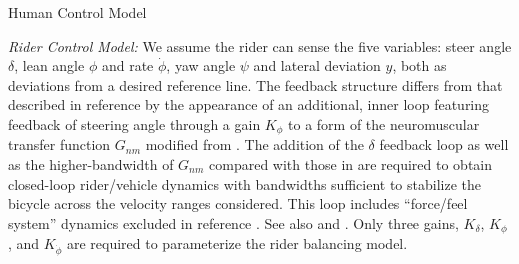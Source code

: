 \documentclass[final]{beamer}
\newlength{\onecolwid}
\begin{document}
{\begin{center}
\begin{columns}[t]
\begin{column}{\onecolwid}
\begin{block}{Human Control Model}
{    \emph{Rider Control Model:} We assume the rider can sense the five
    variables: steer angle $\delta$, lean angle $\phi$ and rate $\dot{\phi}$,
    yaw angle $\psi$ and lateral deviation $y$, both as deviations from a
    desired reference line. The feedback structure differs from that described
    in reference \cite{Hess2006} by the appearance of an additional, inner loop
    featuring feedback of steering angle through a gain $K_\phi$ to a form of
    the neuromuscular transfer function $G_{nm}$ modified from \cite{Hess2006}.
    The addition of the $\delta$ feedback loop as well as the higher-bandwidth
    of $G_{nm}$ compared with those in \cite{Hess2006} are required to obtain
    closed-loop rider/vehicle dynamics with bandwidths sufficient to stabilize
    the bicycle across the velocity ranges considered. This loop includes
    ``force/feel system'' dynamics excluded in reference \cite{Hess2006}. See
    also \cite{Hess1997a} and \cite{Hess1990}. Only three gains, $K_\delta$,
    $K_\phi$ , and $K_{\dot{\phi}}$ are required to parameterize the rider
    balancing model.

}
\end{block}
\end{column}
\end{columns}
\end{center}}
\end{document}
